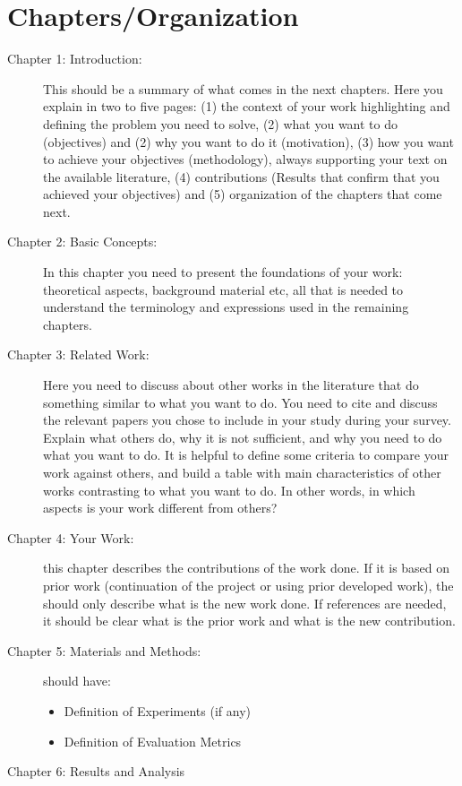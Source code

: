 \section{Chapters/Organization}
\begin{description}
   \item[Chapter 1: Introduction:]
This should be a summary of what comes in the next chapters. Here you explain in two to five
pages: (1) the context of your work highlighting and defining the problem you need to solve, (2)
what you want to do (objectives) and (2) why you want to do it (motivation), (3) how you want to
achieve your objectives (methodology), always supporting your text on the available literature, (4)
contributions (Results that confirm that you achieved your objectives) and (5) organization of the
chapters that come next.
\item[Chapter 2: Basic Concepts:]
In this chapter you need to present the foundations of your work: theoretical aspects, background
material etc, all that is needed to understand the terminology and expressions used in the remaining
chapters.
\item[Chapter 3: Related Work:]
Here you need to discuss about other works in the literature that do something similar to what
you want to do. You need to cite and discuss the relevant papers you chose to include in your study
during your survey. Explain what others do, why it is not sufficient, and why you need to do what
you want to do. It is helpful to define some criteria to compare your work against others, and
build a table with main characteristics of other works contrasting to what you want to do. In other
words, in which aspects is your work different from others?
\item[Chapter 4: Your Work:] this chapter describes the contributions of the work done. If it is based on prior work (continuation of the project or using prior developed work), the should only describe what is the new work done. If references are needed, it should be clear what is the prior work and what is the new contribution.
\item[Chapter 5: Materials and Methods:] should have:
   \begin{itemize}
      \item Definition of Experiments (if any)
      \item Definition of Evaluation Metrics
   \end{itemize}
\item[Chapter 6: Results and Analysis]

\end{description}

